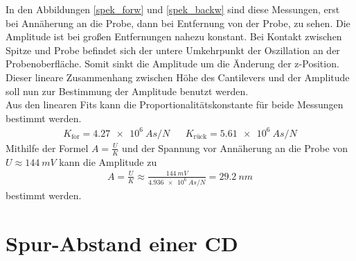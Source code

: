 In den Abbildungen \ref{spek_forw} und \ref{spek_backw} sind diese Messungen, erst
bei Annäherung an die Probe, dann bei Entfernung von der Probe, zu sehen. Die 
Amplitude ist bei großen Entfernungen nahezu konstant. Bei Kontakt zwischen Spitze
und Probe befindet sich der untere Umkehrpunkt der Oszillation an der 
Probenoberfläche.
Somit sinkt die Amplitude um die Änderung der z-Position. Dieser lineare 
Zusammenhang zwischen Höhe des Cantilevers und der Amplitude soll nun zur 
Bestimmung der Amplitude benutzt werden.
\vspace{6pt}\\
Aus den linearen Fits kann die Proportionalitätskonstante für beide Messungen
bestimmt werden.
\begin{align*}
    K_{\text{for}} = \SI{4,27e6}{A s \per N} & & K_{\text{rück}} = 
    \SI{5,61e6}{A s \per N}
\end{align*}
Mithilfe der Formel $\displaystyle A = \frac{U}{K}$ und der Spannung vor Annäherung
an die Probe von $U \approx \SI{144}{mV}$ kann die Amplitude zu
\begin{align*}
    A = \frac{U}{K} \approx \frac{\SI{144}{mV}}{\SI{4,936e6}{A s \per N}} = \SI{29,2}{nm}
\end{align*}
bestimmt werden.

    \section{Spur-Abstand einer CD}

